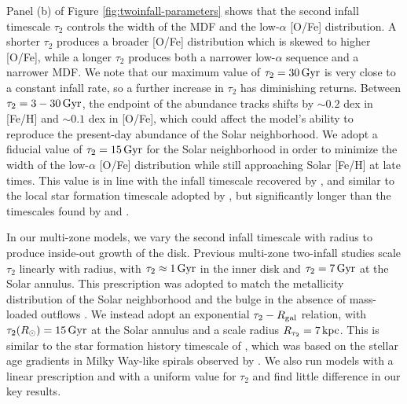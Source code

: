 \documentclass[twocolumn,twocolappendix,linenumbers]{aastex631}
\newcommand{\todo}[1]{{\color{red}#1}}
\begin{document}
Panel (b) of Figure \ref{fig:twoinfall-parameters} shows that 
the second infall timescale $\tau_2$ controls the width of the MDF and the low-$\alpha$ [O/Fe] distribution. A shorter $\tau_2$ produces a broader [O/Fe] distribution which is skewed to higher [O/Fe], while a longer $\tau_2$ produces both a narrower low-$\alpha$ sequence and a narrower MDF. We note that our maximum value of $\tau_2=30\,{\rm Gyr}$ is very close to a constant infall rate, so a further increase in $\tau_2$ has diminishing returns. Between $\tau_2=3-30\,{\rm Gyr}$, the endpoint of the abundance tracks shifts by $\sim0.2$ dex in [Fe/H] and $\sim0.1$ dex in [O/Fe], which could affect the model's ability to reproduce the present-day abundance of the Solar neighborhood. We adopt a fiducial value of $\tau_2=15\,{\rm Gyr}$ for the Solar neighborhood in order to minimize the width of the low-$\alpha$ [O/Fe] distribution while still approaching Solar [Fe/H] at late times. This value is in line with the infall timescale recovered by \citet{spitoni_galactic_2020}, and similar to the local star formation timescale adopted by \citet{johnson_stellar_2021}, but significantly longer than the timescales found by \citet{nissen_high-precision_2020} and \citet{spitoni_apogee_2021}. 

In our multi-zone models, we vary the second infall timescale with radius to produce inside-out growth of the disk. Previous multi-zone two-infall studies \citep[e.g.,][]{chiappini_abundance_2001,palla_chemical_2020} scale $\tau_2$ linearly with radius, with $\tau_2\approx1\,{\rm Gyr}$ in the inner disk and $\tau_2=7\,{\rm Gyr}$ at the Solar annulus. This prescription was adopted to match the metallicity distribution of the Solar neighborhood and the bulge in the absence of mass-loaded outflows \citep{romano_mass_2000}. We instead adopt an exponential $\tau_2 - R_{\rm gal}$ relation, with $\tau_2(R_\odot)=15\,{\rm Gyr}$ at the Solar annulus and a scale radius $R_{\tau_2}=7\,{\rm kpc}$. This is similar to the star formation history timescale of \citet{johnson_stellar_2021}, which was based on the  stellar age gradients in Milky Way-like spirals observed by \citet{sanchez_spatially_2020}. We also run models with a linear prescription and with a uniform value for $\tau_2$ and find little difference in our key results.
\end{document}
